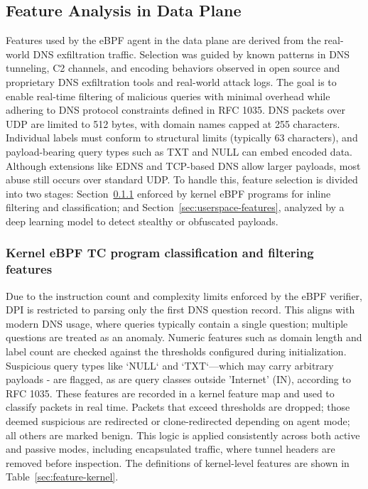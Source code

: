 \documentclass [11pt, proquest] {uwthesis}[2020/02/24]
\begin{document}
\newpage
\subsection{Feature Analysis in Data Plane}
\label{sec:features}
Features used by the eBPF agent in the data plane are derived from the real-world DNS exfiltration traffic. Selection was guided by known patterns in DNS tunneling, C2 channels, and encoding behaviors observed in open source and proprietary DNS exfiltration tools and real-world attack logs. The goal is to enable real-time filtering of malicious queries with minimal overhead while adhering to DNS protocol constraints defined in RFC 1035. DNS packets over UDP are limited to 512 bytes, with domain names capped at 255 characters. Individual labels must conform to structural limits (typically 63 characters), and payload-bearing query types such as TXT and NULL can embed encoded data. Although extensions like EDNS and TCP-based DNS allow larger payloads, most abuse still occurs over standard UDP. To handle this, feature selection is divided into two stages: Section~\ref{sec:kernel-features} enforced by kernel eBPF programs for inline filtering and classification; and 
Section~\ref{sec:userspace-features}, analyzed by a deep learning model to detect stealthy or obfuscated payloads.

\subsubsection{Kernel eBPF TC program classification and filtering features}
\label{sec:kernel-features}
Due to the instruction count and complexity limits enforced by the eBPF verifier, DPI is restricted to parsing only the first DNS question record. This aligns with modern DNS usage, where queries typically contain a single question; multiple questions are treated as an anomaly. Numeric features such as domain length and label count are checked against the thresholds configured during initialization. Suspicious query types like `NULL` and `TXT`—which may carry arbitrary payloads - are flagged, as are query classes outside 'Internet' (IN), according to RFC 1035. These features are recorded in a kernel feature map and used to classify packets in real time. Packets that exceed thresholds are dropped; those deemed suspicious are redirected or clone-redirected depending on agent mode; all others are marked benign. This logic is applied consistently across both active and passive modes, including encapsulated traffic, where tunnel headers are removed before inspection. The definitions of kernel-level features are shown in Table~\ref{sec:feature-kernel}.
\end{document}
